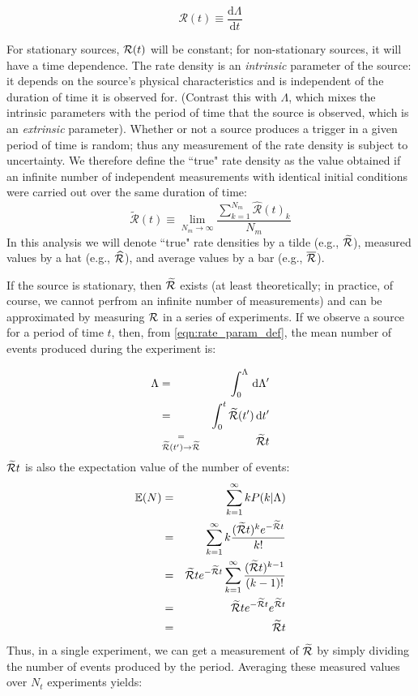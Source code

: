 \begin{equation}
\label{eqn:rate_param_def}
\mathcal{R}(t) \equiv \frac{\mathrm{d}\Lambda}{\mathrm{d}t}
\end{equation}

For stationary sources, $\mathcal{R}(t)$ will be constant; for non-stationary sources, it will have a time dependence. The rate density is an \emph{intrinsic} parameter of the source: it depends on the source's physical characteristics and is independent of the duration of time it is observed for. (Contrast this with $\Lambda$, which mixes the intrinsic parameters with the period of time that the source is observed, which is an \emph{extrinsic} parameter). Whether or not a source produces a trigger in a given period of time is random; thus any measurement of the rate density is subject to uncertainty. We therefore define the ``true" rate density as the value obtained if an infinite number of independent measurements with identical initial conditions were carried out over the same duration of time:
\begin{equation}
\label{eqn:true_rate_param_def}
\widetilde{\mathcal{R}}(t) \equiv \lim_{N_m \to \infty} \frac{\sum_{k=1}^{N_m} \widehat{\mathcal{R}}(t)_{k}}{N_m}
\end{equation}
In this analysis we will denote ``true" rate densities by a tilde (e.g., $\widetilde{\mathcal{R}}$), measured values by a hat (e.g., $\widehat{\mathcal{R}}$), and average values by a bar (e.g., $\overline{\mathcal{R}}$).

If the source is stationary, then $\widetilde{\mathcal{R}}$ exists (at least theoretically; in practice, of course, we cannot perfrom an infinite number of measurements) and can be approximated by measuring $\mathcal{R}$ in a series of experiments. If we observe a source for a period of time $t$, then, from \ref{eqn:rate_param_def}, the mean number of events produced during the experiment is:

\begin{eqnarray}
\Lambda & = & \int_{0}^{\Lambda}\, \mathrm{d}\Lambda' \nonumber \\
    & = & \int_{0}^{t} \widetilde{\mathcal{R}}(t')\, \mathrm{d}t' \\
    & \stackrel{=}{_{\widetilde{\mathcal{R}}(t') \rightarrow \widetilde{\mathcal{R}}}} & \widetilde{\mathcal{R}} t
\end{eqnarray}
$\widetilde{\mathcal{R}} t$ is also the expectation value of the number of events:
\begin{eqnarray}
\mathbb{E}(N) & = & \sum_{k=1}^{\infty} k P(k|\Lambda) \nonumber \\
 & = & \sum_{k=1}^{\infty} k \frac{(\widetilde{\mathcal{R}} t)^k e^{-\widetilde{\mathcal{R}} t}}{k!} \nonumber \\
 & = & \widetilde{\mathcal{R}} t e^{-\widetilde{\mathcal{R}} t} \sum_{k=1}^{\infty} \frac{(\widetilde{\mathcal{R}} t)^{k-1}}{(k-1)!} \nonumber \\
 & = & \widetilde{\mathcal{R}} t e^{-\widetilde{\mathcal{R}} t} e^{\widetilde{\mathcal{R}} t} \nonumber \\
 & = & \widetilde{\mathcal{R}} t
\end{eqnarray}
Thus, in a single experiment, we can get a measurement of $\widetilde{\mathcal{R}}$ by simply dividing the number of events produced by the period. Averaging these measured values over $N_t$ experiments yields:

